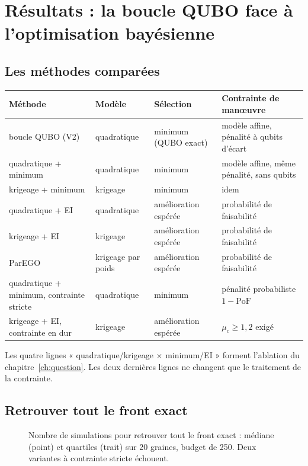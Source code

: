 \chapter{Résultats : la boucle QUBO face à l'optimisation bayésienne}\label{ch:resultats}

\section{Les méthodes comparées}
\begin{center}
\renewcommand{\arraystretch}{1.2}
\begin{tabularx}{\linewidth}{>{\raggedright\arraybackslash}p{3.9cm}llX}
\toprule
Méthode & Modèle & Sélection & Contrainte de manœuvre \\
\midrule
boucle QUBO (V2) & quadratique & minimum (QUBO exact) & modèle affine, pénalité à qubits d'écart \\
quadratique + minimum & quadratique & minimum & modèle affine, même pénalité, sans qubits \\
krigeage + minimum & krigeage & minimum & idem \\
quadratique + EI & quadratique & amélioration espérée & probabilité de faisabilité \\
krigeage + EI & krigeage & amélioration espérée & probabilité de faisabilité \\
ParEGO & krigeage par poids & amélioration espérée & probabilité de faisabilité \\
\midrule
quadratique + minimum, contrainte stricte & quadratique & minimum & pénalité probabiliste $1-\mathrm{PoF}$ \\
krigeage + EI, contrainte en dur & krigeage & amélioration espérée & $\mu_c\ge1{,}2$ exigé \\
\bottomrule
\end{tabularx}
\end{center}
Les quatre lignes « quadratique/krigeage $\times$ minimum/EI » forment l'ablation du chapitre~\ref{ch:question}. Les deux dernières lignes ne changent que le traitement de la contrainte.

\section{Retrouver tout le front exact}
\begin{figure}[htbp]
\centering

\caption{Nombre de simulations pour retrouver tout le front exact : médiane (point) et quartiles (trait) sur 20 graines, budget de 250. Deux variantes à contrainte stricte échouent.}\label{fig:l1-sims}
\end{figure}


